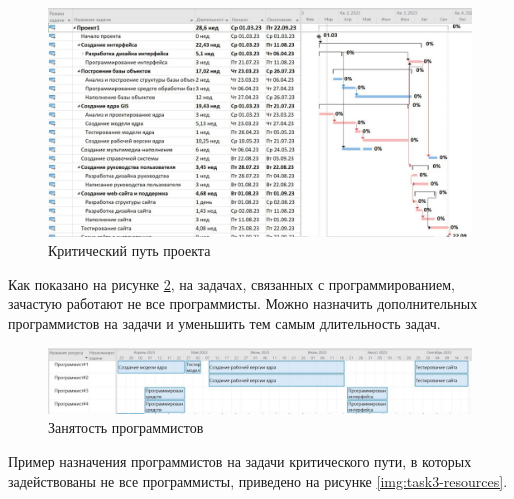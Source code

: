 \begin{figure}[H]
	\begin{center}
		\includegraphics[scale=0.3]{inc/img/task3-critical.jpg}
	\end{center}
	\captionsetup{justification=centering}
	\caption{Критический путь проекта}
	\label{img:task3-critical}
\end{figure}

Как показано на рисунке \ref{img:task3-programmers-before}, на задачах, связанных с программированием, зачастую работают не все программисты. Можно назначить дополнительных программистов на задачи и уменьшить тем самым длительность задач.

\begin{figure}[H]
	\begin{center}
		\includegraphics[scale=0.3]{inc/img/task3-programmers-before.jpg}
	\end{center}
	\captionsetup{justification=centering}
	\caption{Занятость программистов}
	\label{img:task3-programmers-before}
\end{figure}

Пример назначения программистов на задачи критического пути, в которых задействованы не все программисты, приведено на рисунке \ref{img:task3-resources}.

